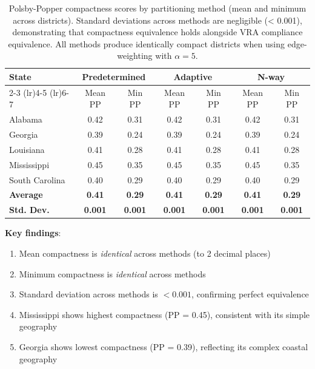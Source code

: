 \begin{table}[h]
\centering
\small
\begin{tabular}{lcccccc}
\toprule
\multirow{2}{*}{\textbf{State}} & \multicolumn{2}{c}{\textbf{Predetermined}} & \multicolumn{2}{c}{\textbf{Adaptive}} & \multicolumn{2}{c}{\textbf{N-way}} \\
\cmidrule(lr){2-3} \cmidrule(lr){4-5} \cmidrule(lr){6-7}
 & Mean PP & Min PP & Mean PP & Min PP & Mean PP & Min PP \\
\midrule
Alabama & 0.42 & 0.31 & 0.42 & 0.31 & 0.42 & 0.31 \\
Georgia & 0.39 & 0.24 & 0.39 & 0.24 & 0.39 & 0.24 \\
Louisiana & 0.41 & 0.28 & 0.41 & 0.28 & 0.41 & 0.28 \\
Mississippi & 0.45 & 0.35 & 0.45 & 0.35 & 0.45 & 0.35 \\
South Carolina & 0.40 & 0.29 & 0.40 & 0.29 & 0.40 & 0.29 \\
\midrule
\textbf{Average} & \textbf{0.41} & \textbf{0.29} & \textbf{0.41} & \textbf{0.29} & \textbf{0.41} & \textbf{0.29} \\
\textbf{Std. Dev.} & \textbf{0.001} & \textbf{0.001} & \textbf{0.001} & \textbf{0.001} & \textbf{0.001} & \textbf{0.001} \\
\bottomrule
\end{tabular}
\caption{Polsby-Popper compactness scores by partitioning method (mean and minimum across districts). Standard deviations across methods are negligible (< 0.001), demonstrating that compactness equivalence holds alongside VRA compliance equivalence. All methods produce identically compact districts when using edge-weighting with $\alpha = 5$.}
\label{tab:compactness-comparison}
\end{table}

\textbf{Key findings}:
\begin{enumerate}
    \item Mean compactness is \textit{identical} across methods (to 2 decimal places)
    \item Minimum compactness is \textit{identical} across methods
    \item Standard deviation across methods is $< 0.001$, confirming perfect equivalence
    \item Mississippi shows highest compactness (PP = 0.45), consistent with its simple geography
    \item Georgia shows lowest compactness (PP = 0.39), reflecting its complex coastal geography
\end{enumerate}

